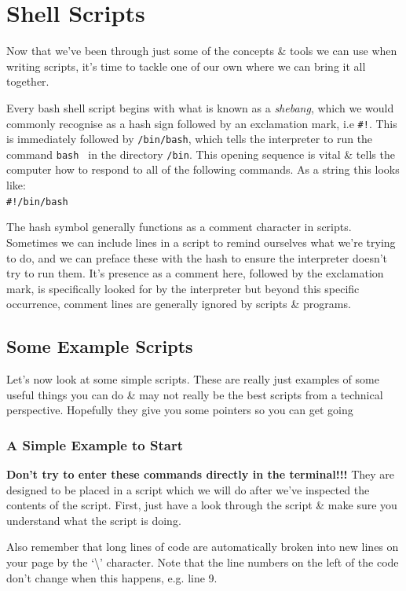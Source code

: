 \documentclass[a4paper,12pt,twoside]{memoir}
\begin{document}
\section{Shell Scripts}
Now that we've been through just some of the concepts \& tools we can use when writing scripts, it's time to tackle one of our own where we can bring it all together.

\begin{information}
Every bash shell script begins with what is known as a \textit{shebang}, which we would commonly recognise as a hash sign followed by an exclamation mark, i.e \texttt{\#!}.
This is immediately followed by \texttt{/bin/bash}, which tells the interpreter to run the command \texttt{bash } in the directory \texttt{/bin}.
This opening sequence is vital \& tells the computer how to respond to all of the following commands.
As a string this looks like:\\

\texttt{\#!/bin/bash}\\
\end{information}

\begin{note}
The hash symbol generally functions as a comment character in scripts.
Sometimes we can include lines in a script to remind ourselves what we're trying to do, and we can preface these with the hash to ensure the interpreter doesn't try to run them.
It's presence as a comment here, followed by the exclamation mark, is specifically looked for by the interpreter but beyond this specific occurrence, comment lines are generally ignored by scripts \& programs.
\end{note}

\subsection{Some Example Scripts}
Let's now look at some simple scripts.
These are really just examples of some useful things you can do \& may not really be the best scripts from a technical perspective.
Hopefully they give you some pointers so you can get going


\subsubsection*{A Simple Example to Start}
\begin{warning}
\textbf{Don't try to enter these commands directly in the terminal!!!}
They are designed to be placed in a script which we will do after we've inspected the contents of the script.
First,  just have a look through the script \& make sure you understand what the script is doing.

Also remember that long lines of code are automatically broken into new lines on your page by the `\textbackslash ' character.
Note that the line numbers on the left of the code don't change when this happens, e.g. line 9.
\end{warning}
\end{document}
